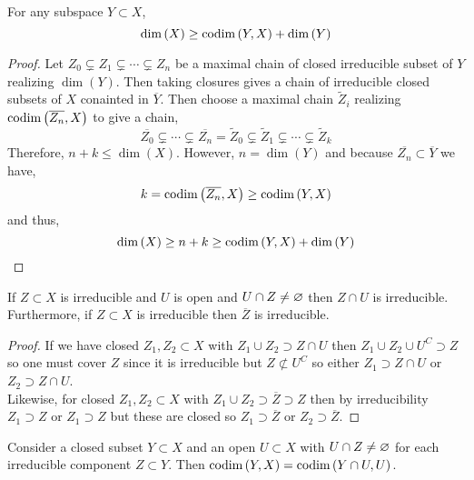 \documentclass[12pt]{article}
\begin{document}
\begin{prop}
For any subspace $Y \subset X$,
\[ \dim{(X)} \ge \mathrm{codim}\left( Y, X \right) + \dim{(Y)} \]
\end{prop}

\begin{proof}
Let $Z_0 \subsetneq Z_1 \subsetneq \cdots \subsetneq Z_n$ be a maximal chain of closed irreducible subset of $Y$ realizing $\dim{(Y)}$. Then taking closures gives a chain of irreducible closed subsets of $X$ conainted in $\overline{Y}$. Then choose a maximal chain $\tilde{Z}_i$ realizing $\mathrm{codim}\left( \overline{Z_n}, X \right)$ to give a chain,
\[ \overline{Z_0} \subsetneq \cdots \subsetneq \overline{Z_n} = \tilde{Z}_0 \subsetneq \tilde{Z}_1 \subsetneq \cdots \subsetneq \tilde{Z}_k \]
Therefore, $n + k \le \dim{(X)}$. However, $n = \dim{(Y)}$ and because $\overline{Z_n} \subset \overline{Y}$ we have,
\[ k = \mathrm{codim}\left( \overline{Z_n}, X \right) \ge \mathrm{codim}\left( Y, X \right) \]
and thus,
\[ \dim{(X)} \ge n + k \ge \mathrm{codim}\left( Y, X \right) + \dim{(Y)} \]
\end{proof}

\begin{lemma}
If $Z \subset X$ is irreducible and $U$ is open and $U \cap Z \neq \varnothing$ then $Z \cap U$ is irreducible. Furthermore, if $Z \subset X$ is irreducible then $\overline{Z}$ is irreducible.
\end{lemma}

\begin{proof}
If we have closed $Z_1, Z_2 \subset X$ with $Z_1 \cup Z_2 \supset Z \cap U$ then $Z_1 \cup Z_2 \cup U^C \supset Z$ so one must cover $Z$ since it is irreducible but $Z \not\subset U^C$ so either $Z_1 \supset Z \cap U$ or $Z_2 \supset Z \cap U$.
\bigskip\\
Likewise, for closed $Z_1, Z_2 \subset X$ with $Z_1 \cup Z_2 \supset \overline{Z} \supset Z$ then by irreducibility $Z_1 \supset Z$ or $Z_1 \supset Z$ but these are closed so $Z_1 \supset \overline{Z}$ or $Z_2 \supset \overline{Z}$. 
\end{proof}

\begin{lemma} \label{codimension_opens}
Consider a closed subset $Y \subset X$ and an open $U \subset X$ with $U \cap Z \neq \varnothing$ for each irreducible component $Z \subset Y$. Then $\mathrm{codim}\left( Y, X \right) = \mathrm{codim}\left( Y \cap U, U \right)$. 
\end{lemma}
\end{document}
